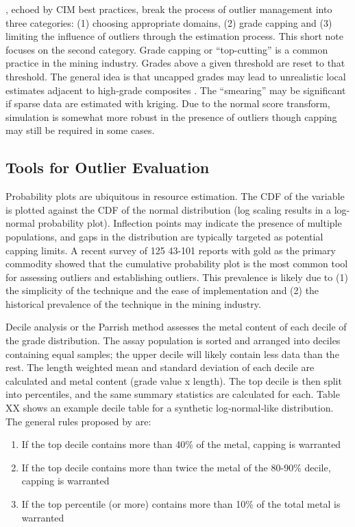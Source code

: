 \cite{leuangthong2015dealing}, echoed by CIM best practices, break the process of outlier management into three categories: (1) choosing appropriate domains, (2) grade capping and (3) limiting the influence of outliers through the estimation process. This short note focuses on the second category. Grade capping or ``top-cutting'' is a common practice in the mining industry. Grades above a given threshold are reset to that threshold. The general idea is that uncapped grades may lead to unrealistic local estimates adjacent to high-grade composites \citep{nowak2013suggestions}. The ``smearing'' may be significant if sparse data are estimated with kriging. Due to the normal score transform, simulation is somewhat more robust in the presence of outliers though capping may still be required in some cases.

\FloatBarrier
\subsection{Tools for Outlier Evaluation}
\label{subsec:02tools}

Probability plots are ubiquitous in resource estimation. The \gls{CDF} of the variable is plotted against the \gls{CDF} of the normal distribution (log scaling results in a log-normal probability plot). Inflection points may indicate the presence of multiple populations, and gaps in the distribution are typically targeted as potential capping limits. A recent survey of 125 43-101 reports with gold as the primary commodity showed that the cumulative probability plot is the most common tool for assessing outliers and establishing outliers. This prevalence is likely due to (1) the simplicity of the technique and the ease of implementation and (2) the historical prevalence of the technique in the mining industry.

Decile analysis or the Parrish method \citep{parrish1997geologist} assesses the metal content of each decile of the grade distribution. The assay population is sorted and arranged into deciles containing equal samples; the upper decile will likely contain less data than the rest. The length weighted mean and standard deviation of each decile are calculated and metal content (grade value x length). The top decile is then split into percentiles, and the same summary statistics are calculated for each. Table XX shows an example decile table for a synthetic log‐normal‐like distribution. The general rules proposed by \cite{parrish1997geologist} are:

\begin{enumerate}
    \item If the top decile contains more than 40\% of the metal, capping is warranted
    \item If the top decile contains more than twice the metal of the 80-90\% decile, capping is warranted
    \item If the top percentile (or more) contains more than 10\% of the total metal is warranted
\end{enumerate}

